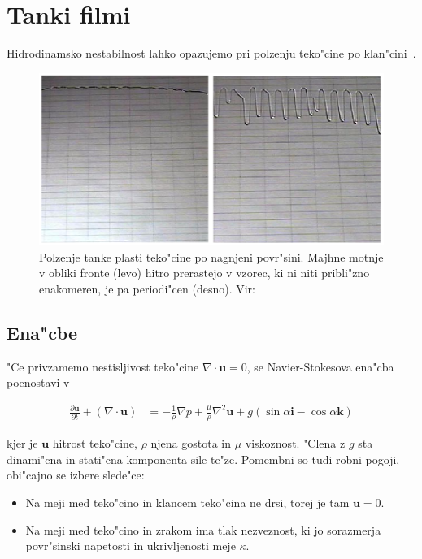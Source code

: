 \documentclass[a4paper,10pt]{article}
\renewcommand{\vec}{\mathbf}
\begin{document}
\section{Tanki filmi}

Hidrodinamsko nestabilnost lahko opazujemo pri polzenju teko"cine po klan"cini~\cite{kondic}. 


\begin{figure}[h]
\centering
 \includegraphics[width=.9\textwidth]{./Slike/film-slika}
\caption{Polzenje tanke plasti teko"cine po nagnjeni povr"sini. Majhne motnje v obliki fronte (levo) hitro prerastejo v vzorec, ki ni niti pribli"zno enakomeren, je pa periodi"cen (desno). Vir: \cite{kondic}}
\label{fig:film-neenakomernost}
\end{figure}

\subsection{Ena"cbe}

"Ce privzamemo nestisljivost teko"cine $\nabla \cdot \vec u = 0$, se Navier-Stokesova ena"cba poenostavi v 

\begin{align}
 \label{eq:ns-film}
 \frac{\partial \vec u}{\partial t} + (\nabla \cdot \vec u) &= -\frac{1}{\rho}\nabla p + \frac{\mu}{\rho}\nabla^2 \vec u + g (\sin \alpha \vec i - \cos \alpha \vec k)
\end{align}

kjer je $\vec u$ hitrost teko"cine, $\rho$ njena gostota in $\mu$ viskoznost. "Clena z $g$ sta dinami"cna in stati"cna komponenta sile te"ze. Pomembni so tudi robni pogoji, obi"cajno se izbere slede"ce:

\begin{itemize}
 \item Na meji med teko"cino in klancem teko"cina ne drsi, torej je tam $\vec u = 0$. 
 \item Na meji med teko"cino in zrakom ima tlak nezveznost, ki jo sorazmerja povr"sinski napetosti in ukrivljenosti meje $\kappa$. 
\end{itemize}
\end{document}
